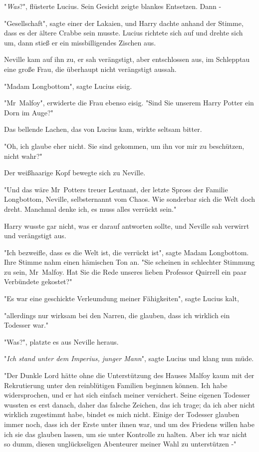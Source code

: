 {"\emph{Was}?", flüsterte Lucius. Sein Gesicht zeigte blankes Entsetzen. Dann -

"Gesellschaft", sagte einer der Lakaien, und Harry dachte anhand der Stimme, dass es der ältere Crabbe sein musste. Lucius richtete sich auf und drehte sich um, dann stieß er ein missbilligendes Zischen aus.

Neville kam auf ihn zu, er sah verängstigt, aber entschlossen aus, im Schlepptau eine große Frau, die überhaupt nicht verängstigt aussah.

"Madam Longbottom", sagte Lucius eisig.

"Mr~Malfoy", erwiderte die Frau ebenso eisig. "Sind Sie unserem Harry Potter ein Dorn im Auge?"

Das bellende Lachen, das von Lucius kam, wirkte seltsam bitter.

"Oh, ich glaube eher nicht. Sie sind gekommen, um ihn vor mir zu beschützen, nicht wahr?"

Der weißhaarige Kopf bewegte sich zu Neville.

"Und das wäre Mr~Potters treuer Leutnant, der letzte Spross der Familie Longbottom, Neville, selbsternannt vom Chaos. Wie sonderbar sich die Welt doch dreht. Manchmal denke ich, es muss alles verrückt sein."

Harry wusste gar nicht, was er darauf antworten sollte, und Neville sah verwirrt und verängstigt aus.

"Ich bezweifle, dass es die Welt ist, die verrückt ist", sagte Madam Longbottom. Ihre Stimme nahm einen hämischen Ton an. "Sie scheinen in schlechter Stimmung zu sein, Mr~Malfoy. Hat Sie die Rede unseres lieben Professor Quirrell ein paar Verbündete gekostet?"

"Es war eine geschickte Verleumdung meiner Fähigkeiten", sagte Lucius kalt,

"allerdings nur wirksam bei den Narren, die glauben, dass ich wirklich ein Todesser war."

"Was?", platzte es aus Neville heraus.

"\emph{Ich stand unter dem Imperius, junger Mann}", sagte Lucius und klang nun müde.

"Der Dunkle Lord hätte ohne die Unterstützung des Hauses Malfoy kaum mit der Rekrutierung unter den reinblütigen Familien beginnen können. Ich habe widersprochen, und er hat sich einfach meiner versichert. Seine eigenen Todesser wussten es erst danach, daher das falsche Zeichen, das ich trage; da ich aber nicht wirklich zugestimmt habe, bindet es mich nicht. Einige der Todesser glauben immer noch, dass ich der Erste unter ihnen war, und um des Friedens willen habe ich sie das glauben lassen, um sie unter Kontrolle zu halten. Aber ich war nicht so dumm, diesen unglückseligen Abenteurer meiner Wahl zu unterstützen -"

}
